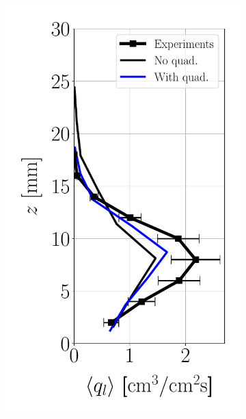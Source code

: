 \begin{figure}[ht]
\flushleft
\begin{subfigure}[b]{0.2\textwidth}
	\flushleft
   \includegraphics[scale=0.35]{./part2_developments/figures_ch6_lagrangian_JICF/params_quadtrees/profiles/flux_along_z}
\end{subfigure}
\hspace*{0.5in}
\begin{subfigure}[b]{0.2\textwidth}
	\flushleft

\end{subfigure}
\end{figure}
